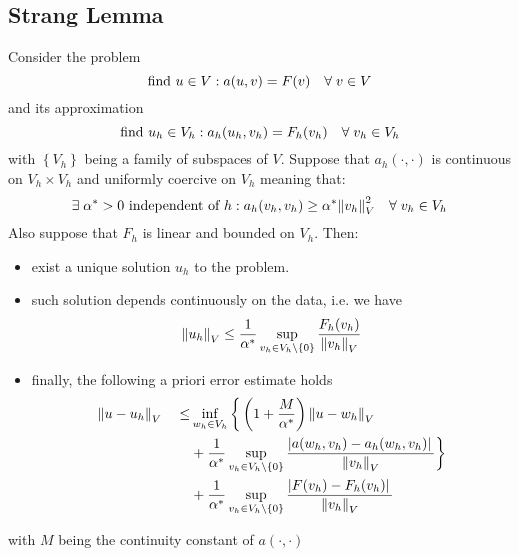 \subsection{Strang Lemma}
\begin{lemma}
Consider the problem
\begin{equation}
    \text{find } u \in V: a(u,v) = F(v) \quad \forall \; v \in V
    \label{another_weak_formulation}
\end{equation}
and its approximation 
\begin{equation}
    \text{find } u_h \in V_h: a_h(u_h,v_h) = F_h(v_h) \quad \forall \; v_h \in V_h
    \label{another_weak_approximation}
\end{equation}
with \(\left\{V_h\right\}\) being a family of subspaces of \(V\). Suppose that \(a_h(\cdot,\cdot)\) is continuous on \(V_h \times V_h\) and uniformly coercive on \(V_h\) meaning that:
\[
    \exists \; \alpha^* > 0 \text{ independent of }h : a_h(v_h, v_h) \geq \alpha^* \norm{v_h}^2_V \quad \forall \; v_h \in V_h
\]
Also suppose that \(F_h\) is linear and bounded on \(V_h\). Then:
\begin{itemize}
    \item exist a unique solution \(u_h\) to the problem.
    \item such solution depends continuously on the data, i.e. we have 
    \[
        \norm{u_h}_V \leq \frac{1}{\alpha^*} \sup_{v_h \in V_h \backslash \left\{0\right\}} \frac{F_h(v_h)}{\norm{v_h}_V}
    \]
    \item  finally, the following a priori error estimate holds 
    \begin{align*}
        \norm{u-u_h}_V \quad \leq & \inf_{w_h \in V_h} \bigg\{\left(1+\frac{M}{\alpha^*}\right) \norm{u-w_h}_V \\
        &+ \frac{1}{\alpha^*} \sup_{v_h \in V_h \backslash \left\{0\right\}} \frac{\abs*{a(w_h, v_h) - a_h(w_h, v_h)}}{\norm{v_h}_V} \bigg\} \\
        &+ \frac{1}{\alpha^*} \sup_{v_h \in V_h \backslash \left\{0\right\}} \frac{\abs*{F(v_h)-F_h(v_h)}}{\norm{v_h}_V} 
    \end{align*}
\end{itemize}
with \(M\) being the continuity constant of \(a(\cdot, \cdot)\)
\end{lemma}
